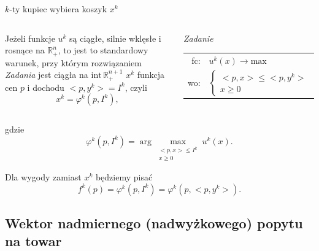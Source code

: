 \documentclass[a4paper, 11pt]{beamer}
\begin{document}
      \begin{frame}{$k$-ty kupiec wybiera koszyk $x^k$}

	\begin{columns}
	    Jeżeli funkcje $u^k$ są ciągłe, silnie wklęsłe i rosnące
	    na $\mathbb{R}^n_{+}$, to jest to standardowy warunek, przy którym
	    rozwiązaniem \textit{Zadania} jest ciągła na $\text{int} \,
	    \mathbb{R}^{n+1}_{+}$  $x^k$ funkcja cen $p$ i dochodu $<p, y^k> = I^k$,
	    czyli
	    \[ x^k = \varphi^k (p, I^k), \]

	    \begin{block}{\textit{Zadanie}}
	      \begin{tabular}{rl}
		fc: & $u^k(x) \to \text{max}$\\
		wo: & $\left\{\begin{array}{l}
				  <p, x> \leq <p, y^k>\\ 
				  x \geq 0 
			      \end{array}
		       \right.$
	      \end{tabular}
	    \end{block}
       \end{columns}

    \vskip3pt
          gdzie
     \[ \varphi^k (p, I^k) = \arg \max_{\begin{array}{c} <p, x> \leq I^k\\ x
     \geq 0 \end{array}} u^k(x). \]

     Dla wygody zamiast $x^k$ będziemy pisać $$f^k(p) = \varphi^k (p, I^k) =
     \varphi^k (p, <p, y^k>).$$

    \end{frame}

    \subsection{Wektor nadmiernego (nadwyżkowego) popytu na towar}
\end{document}
